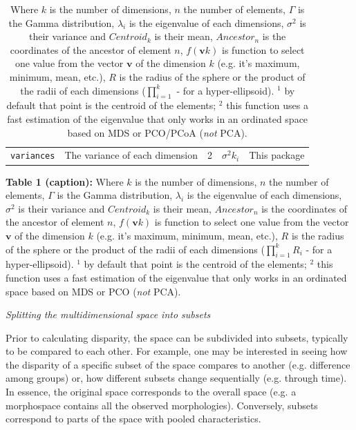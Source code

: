 \documentclass[12pt,letterpaper]{article}
\renewcommand{\subsection}[1]{%
\bigskip
\begin{center}
\begin{large}
\normalfont\itshape #1
\end{large}
\end{center}}
\begin{document}
\begin{table}
{\begin{tabular}{p{2cm}|p{5cm}|p{1cm}|p{5cm}|p{5cm}}
        \hline
        \texttt{variances} & The variance of each dimension & 2 & $\sigma^{2}{k_i}$ & This package \\
    \end{tabular}
}%
    \caption{\small{Where $k$ is the number of dimensions, $n$ the number of elements, $\Gamma$ is the Gamma distribution, $\lambda_i$ is the eigenvalue of each dimensions, $\sigma^{2}$ is their variance and $Centroid_{k}$ is their mean, $Ancestor_{n}$ is the coordinates of the ancestor of element $n$, $f(\mathbf{v}k)$ is function to select one value from the vector $\mathbf{v}$ of the dimension $k$ (e.g. it's maximum, minimum, mean, etc.), $R$ is the radius of the sphere or the product of the radii of each dimensions ($\displaystyle\prod_{i=1}^{k}$ - for a hyper-ellipsoid). $^1$ by default that point is the centroid of the elements; $^2$ this function uses a fast estimation of the eigenvalue that only works in an ordinated space based on MDS or PCO/PCoA (\textit{not} PCA).}}
    \label{Tab:metrics}
\end{table}

\textbf{Table 1 (caption):} Where $k$ is the number of dimensions, $n$ the number of elements, $\Gamma$ is the Gamma distribution, $\lambda_i$ is the eigenvalue of each dimensions, $\sigma^{2}$ is their variance and $Centroid_{k}$ is their mean, $Ancestor_{n}$ is the coordinates of the ancestor of element $n$, $f(\mathbf{v}k)$ is function to select one value from the vector $\mathbf{v}$ of the dimension $k$ (e.g. it's maximum, minimum, mean, etc.), $R$ is the radius of the sphere or the product of the radii of each dimensions ($\displaystyle\prod_{i=1}^{k}R_{i}$ - for a hyper-ellipsoid). $^1$ by default that point is the centroid of the elements; $^2$ this function uses a fast estimation of the eigenvalue that only works in an ordinated space based on MDS or PCO (\textit{not} PCA).
\label{Tab:metrics}


\subsection{Splitting the multidimensional space into subsets}
Prior to calculating disparity, the space can be subdivided into subsets, typically to be compared to each other.
For example, one may be interested in seeing how the disparity of a specific subset of the space compares to another (e.g. difference among groups) or, how different subsets change sequentially (e.g. through time).
In essence, the original space corresponds to the overall space (e.g. a morphospace contains all the observed morphologies).
Conversely, subsets correspond to parts of the space with pooled characteristics.
\end{document}
